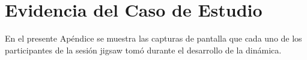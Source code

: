 \chapter{Evidencia del Caso de Estudio}\label{apendice.D}
En el presente Apéndice se muestra las capturas de pantalla que cada uno de los participantes de la sesión jigsaw tomó durante el desarrollo de la dinámica.
